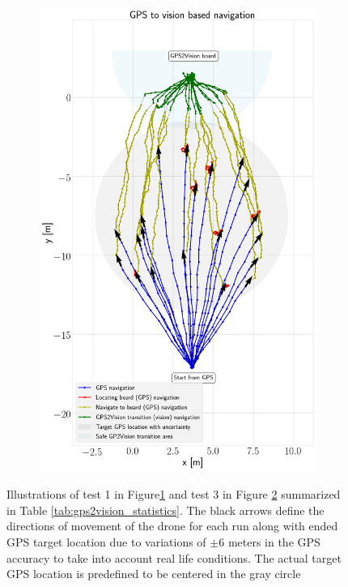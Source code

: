 \documentclass[../Head/report.tex]{subfiles}
\begin{document}
\begin{figure}[H]
\begin{subfigure}[t]{.45\textwidth}
        \caption{}
        \label{fig:GPS2Vision_test1}
    \end{subfigure}
     \hspace{0.2em}
    \begin{subfigure}[t]{.45\textwidth}
        \centering
        \includegraphics[width=\textwidth]{../Figures/GPS2Vision/test3_7-10ms_wind_20_runs/gps2vision.png}
        \caption{}
        \label{fig:GPS2Vision_test3}
    \end{subfigure}
    \caption{Illustrations of test 1 in Figure\ref{fig:GPS2Vision_test1} and test 3 in Figure \ref{fig:GPS2Vision_test3} summarized in Table \ref{tab:gps2vision_statistics}. The black arrows define the directions of movement of the drone for each run along with ended GPS target location due to variations of $\pm 6$ meters in the GPS accuracy to take into account real life conditions. The actual target GPS location is predefined to be centered in the gray circle}
    \label{fig:GPS2Vision_test1_test3}
\end{figure}
\end{document}
